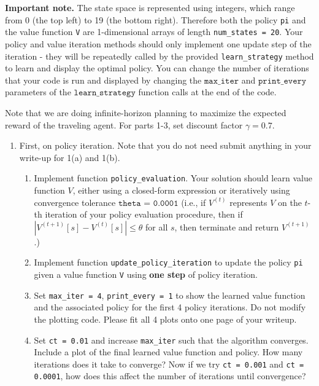 \documentclass[submit]{harvardml}
\begin{document}
\begin{problem}
\noindent \textbf{Important note.} The state space is represented using integers, which range from 0 (the top left) to 19 (the bottom right). Therefore both the policy \texttt{pi} and the value function \texttt{V} are 1-dimensional arrays of length \texttt{num\_states = 20}. Your policy and value iteration methods should only implement one update step of the iteration - they will be repeatedly called by the provided \texttt{learn\_strategy} method to learn and display the optimal policy. You can change the number of iterations that your code is run and displayed by changing the $\texttt{max\_iter}$ and $\texttt{print\_every}$ parameters of the $\texttt{learn\_strategy}$ function calls at the end of the code.

Note that we are doing infinite-horizon planning to maximize the expected reward of the traveling agent. For parts 1-3, set discount factor $\gamma = 0.7$.

\begin{enumerate}
    \item First, on policy iteration. Note that you do not need submit anything in your write-up for 1(a) and 1(b).
    \begin{enumerate}
        \item Implement function \texttt{policy\_evaluation}.  Your solution should learn value function $V$, either using a closed-form expression or iteratively using convergence tolerance $\texttt{theta = 0.0001}$ (i.e., if $V^{(t)}$ represents $V$ on the $t$-th iteration of your policy evaluation procedure, then if $|V^{(t + 1)}[s] - V^{(t)}[s]| \leq \theta$ for all $s$, then terminate and return $V^{(t + 1)}$.)
    
        \item Implement function \texttt{update\_policy\_iteration} to update the policy \texttt{pi} given a value function \texttt{V} using \textbf{one step} of policy iteration.
        
        \item Set \texttt{max\_iter = 4}, \texttt{print\_every = 1} to show the learned value function and the associated policy for the first 4 policy iterations. Do not modify the plotting code. Please fit all 4 plots onto one page of your writeup.
        
        \item Set \texttt{ct = 0.01} and increase \texttt{max\_iter} such that the algorithm converges. Include a plot of the final learned value function and policy. How many iterations does it take to converge? Now if we try \texttt{ct = 0.001} and \texttt{ct = 0.0001}, how does this affect the number of iterations until convergence?
    \end{enumerate}
      

\end{enumerate}
\end{problem}
\end{document}
